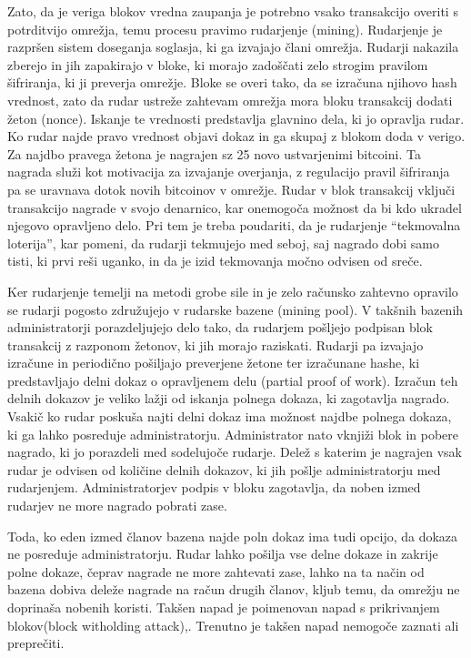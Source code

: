 \documentclass{acm_proc_article-sp}
\begin{document}
Zato, da je veriga blokov vredna zaupanja je potrebno vsako transakcijo overiti s potrditvijo omrežja, temu procesu pravimo rudarjenje (mining). Rudarjenje je razpršen sistem doseganja soglasja, ki ga izvajajo člani omrežja. Rudarji nakazila zberejo in jih zapakirajo v bloke, ki morajo zadoščati zelo strogim pravilom šifriranja, ki ji preverja omrežje.  Bloke se overi tako, da se izračuna njihovo hash vrednost, zato da rudar ustreže zahtevam omrežja mora bloku transakcij dodati žeton (nonce). Iskanje te vrednosti predstavlja glavnino dela, ki jo opravlja rudar. Ko rudar najde pravo vrednost objavi dokaz in ga skupaj z blokom doda v verigo. Za najdbo pravega žetona je nagrajen sz 25 novo ustvarjenimi bitcoini. Ta nagrada služi kot motivacija za izvajanje overjanja, z regulacijo pravil šifriranja pa se uravnava dotok novih bitcoinov v omrežje. Rudar v blok transakcij vključi transakcijo nagrade v svojo denarnico, kar onemogoča možnost da bi kdo ukradel njegovo opravljeno delo. Pri tem je treba poudariti, da je rudarjenje “tekmovalna loterija”, kar pomeni, da rudarji tekmujejo med seboj, saj nagrado dobi samo tisti, ki prvi reši uganko, in da je izid tekmovanja močno odvisen od sreče.

Ker rudarjenje temelji na metodi grobe sile in je zelo računsko zahtevno opravilo se rudarji pogosto združujejo v rudarske bazene (mining pool). V takšnih bazenih administratorji porazdeljujejo delo tako, da rudarjem pošljejo podpisan blok transakcij z razponom žetonov, ki jih morajo raziskati. Rudarji pa izvajajo izračune in periodično pošiljajo preverjene žetone ter izračunane hashe, ki predstavljajo delni dokaz o opravljenem delu (partial proof of work). Izračun teh delnih dokazov je veliko lažji od iskanja polnega dokaza, ki zagotavlja nagrado. Vsakič ko rudar poskuša najti delni dokaz ima možnost najdbe polnega dokaza, ki ga lahko posreduje administratorju. Administrator nato vknjiži blok in pobere nagrado, ki jo porazdeli med sodelujoče rudarje. Delež s katerim je nagrajen vsak rudar je odvisen od količine delnih dokazov, ki jih pošlje administratorju med rudarjenjem. Administratorjev podpis v bloku zagotavlja, da noben izmed rudarjev ne more nagrado pobrati zase.

Toda, ko eden izmed članov bazena najde poln dokaz ima tudi opcijo, da dokaza ne posreduje administratorju. Rudar lahko pošilja vse delne dokaze in zakrije polne dokaze, čeprav nagrade ne more zahtevati zase, lahko na ta način od bazena dobiva deleže nagrade na račun drugih članov, kljub temu, da omrežju ne doprinaša nobenih koristi. Takšen napad je poimenovan napad s prikrivanjem blokov(block witholding attack)\cite{analysisofbitcoin},\cite{financialcryptography}. Trenutno je takšen napad nemogoče zaznati ali preprečiti.
\end{document}
